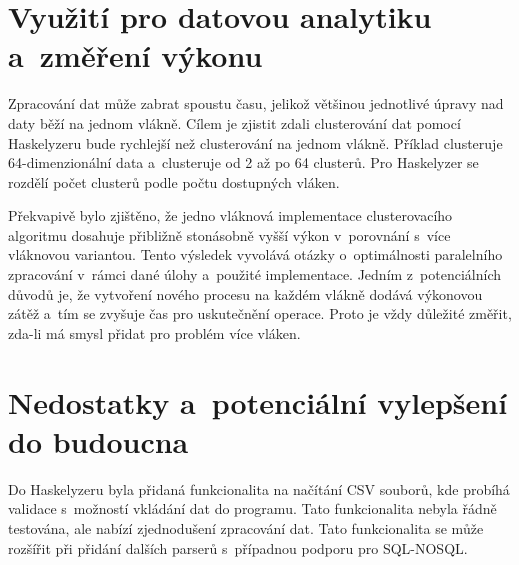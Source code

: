 \documentclass[male, czech]{kithesis}
\begin{document}
\section{Využití pro datovou analytiku a~změření výkonu}
 
Zpracování dat může zabrat spoustu času, 
jelikož většinou jednotlivé úpravy nad daty běží na jednom vlákně.
Cílem je zjistit zdali clusterování dat pomocí 
Haskelyzeru bude rychlejší než clusterování na jednom vlákně.
Příklad clusteruje 64-dimenzionální data a~clusteruje 
od 2 až po 64 clusterů. 
Pro Haskelyzer se rozdělí počet clusterů podle počtu dostupných vláken.

Překvapivě bylo zjištěno, 
že jedno vláknová implementace clusterovacího algoritmu 
dosahuje přibližně stonásobně vyšší výkon v~porovnání s~více vláknovou variantou. 
Tento výsledek vyvolává otázky o~optimálnosti paralelního zpracování v~rámci dané úlohy 
a~použité implementace.
Jedním z~potenciálních důvodů je, 
že vytvoření nového procesu na každém vlákně dodává výkonovou zátěž
a~tím se zvyšuje čas pro uskutečnění operace.
Proto je vždy důležité změřit, 
zda-li má smysl přidat pro problém více vláken.

{\begin{center}
\end{center}
}

\section{Nedostatky a~potenciální vylepšení do budoucna}

Do Haskelyzeru byla přidaná funkcionalita na načítání CSV souborů,
kde probíhá validace s~možností vkládání dat do programu.
Tato funkcionalita nebyla řádně testována, 
ale nabízí zjednodušení zpracování dat.
Tato funkcionalita se může rozšířit při přidání dalších parserů 
s~případnou podporu pro SQL-NOSQL.
\end{document}
